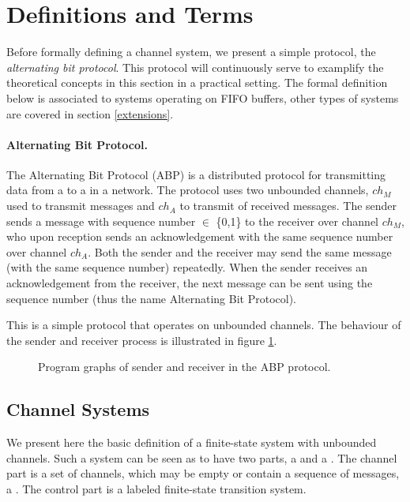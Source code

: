 \section{Definitions and Terms}
\label{definitions}
Before formally defining a channel system, we present a simple protocol, the \emph{alternating bit protocol}. This protocol will continuously serve to examplify the theoretical concepts in this section in a practical setting. The formal definition below is associated to systems operating on FIFO buffers, other types of systems are covered in section \ref{extensions}. 

\paragraph{Alternating Bit Protocol.} The Alternating Bit Protocol (ABP) is a distributed protocol for transmitting data from a  to a  in a network. The protocol uses two unbounded channels, $ch_M$ used to transmit messages and $ch_A$ to transmit  of received messages. The sender sends a message with sequence number  $\in$ \{0,1\} to the receiver over channel $ch_M$, who upon reception sends an acknowledgement with the same sequence number over channel $ch_A$. Both the sender and the receiver may send the same message (with the same sequence number) repeatedly. When the sender receives an acknowledgement from the receiver, the next message can be sent using the sequence number  (thus the name Alternating Bit Protocol).

This is a simple protocol that operates on unbounded channels. The behaviour of the sender and receiver process is illustrated in figure \ref{abpgraph}.

\begin{figure}[h!]
\subfloat[Sender]{\label{fig:in}
\abpsender{}
}
\subfloat[Receiver]{\label{fig:in}
\abpreceiver{}
}
\caption{Program graphs of sender and receiver in the ABP protocol.}
\label{abpgraph}
\end{figure}

\subsection{Channel Systems}
We present here the basic definition of a finite-state system with unbounded channels. Such a system can be seen as to have two parts, a  and a . The channel part is a set of channels, which may be empty or contain a sequence of messages, a . The control part is a labeled finite-state transition system. 

